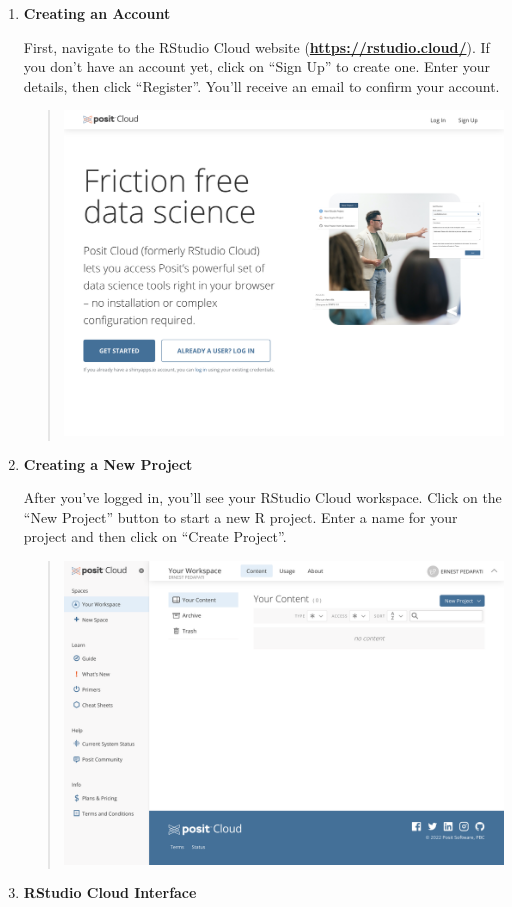 \documentclass[
  letterpaper,
  DIV=11,
  numbers=noendperiod]{scrreprt}
\begin{document}
\begin{enumerate}
\def\labelenumi{\arabic{enumi}.}
\item
  \textbf{Creating an Account}

  First, navigate to the RStudio Cloud website
  (\href{https://rstudio.cloud/}{\textbf{https://rstudio.cloud/}}). If
  you don't have an account yet, click on ``Sign Up'' to create one.
  Enter your details, then click ``Register''. You'll receive an email
  to confirm your account.

  \begin{quote}
  \includegraphics{./images/posit.cloud_ (1).png}
  \end{quote}
\item
  \textbf{Creating a New Project}

  After you've logged in, you'll see your RStudio Cloud workspace. Click
  on the ``New Project'' button to start a new R project. Enter a name
  for your project and then click on ``Create Project''.

  \begin{quote}
  \includegraphics{./images/posit.cloud_login_code=sObwdDsWld0OQQ5q2vyhnQKQLbqk35.png}
  \end{quote}
\item
  \textbf{RStudio Cloud Interface}


\end{enumerate}
\end{document}
